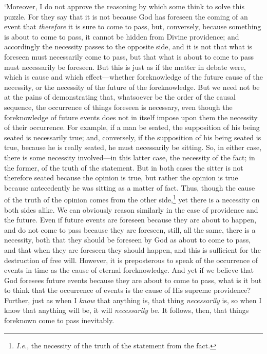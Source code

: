 \documentclass[11pt]{book}
\begin{document}
`Moreover, I do not approve the reasoning by which some think to solve
this puzzle. For they say that it is not because God has foreseen the
coming of an event that \emph{therefore} it is sure to come to pass, but,
conversely, because something is about to come to pass, it cannot be
hidden from Divine providence; and accordingly the necessity passes to
the opposite side, and it is not that what is foreseen must necessarily
come to pass, but that what is about to come to pass must necessarily be
foreseen. But this is just as if the matter in debate were, which is
cause and which effect---whether foreknowledge of the future cause of the
necessity, or the necessity of the future of the foreknowledge. But we
need not be at the pains of demonstrating that, whatsoever be the order
of the causal sequence, the occurrence of things foreseen is necessary,
even though the foreknowledge of future events does not in itself
impose upon them the necessity of their occurrence. For example, if a
man be seated, the supposition of his being seated is necessarily true;
and, conversely, if the supposition of his being seated is true, because
he is really seated, he must necessarily be sitting. So, in either case,
there is some necessity involved---in this latter case, the necessity of
the fact; in the former, of the truth of the statement. But in both
cases the sitter is not therefore seated because the opinion is true,
but rather the opinion is true because antecedently he was sitting as a
matter of fact. Thus, though the cause of the truth of the opinion comes
from the other side,\footnote{\emph{I.e.}, the necessity of the truth of the statement from the fact.}
yet there is a necessity on both sides alike. We
can obviously reason similarly in the case of providence and the future.
Even if future events are foreseen because they are about to happen, and
do not come to pass because they are foreseen, still, all the same,
there is a necessity, both that they should be foreseen by God as about
to come to pass, and that when they are foreseen they should happen, and
this is sufficient for the destruction of free will. However, it is
preposterous to speak of the occurrence of events in time as the cause
of eternal foreknowledge. And yet if we believe that God foresees future
events because they are about to come to pass, what is it but to think
that the occurrence of events is the cause of His supreme providence?
Further, just as when I \emph{know} that anything is, that thing
\emph{necessarily} is, so when I know that anything will be, it will
\emph{necessarily} be. It follows, then, that things foreknown come to pass
inevitably.
\end{document}
